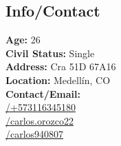 \documentclass[american]{cv-class}
\begin{document}
\begin{aside}
	\section{Info/Contact}
	\textbf{Age:} 26 \\
	\textbf{Civil Status:} Single \\
	\textbf{Address:} Cra 51D 67A16 \\
	\textbf{Location:} Medellín, CO \\
	\textbf{Contact/Email:}\\ \href{https://bit.ly/3ls6eXV}{/+573116345180}\\
	\href{https://join.skype.com/invite/GVNxPbWtJxdc}{/carlos.orozco22}\\
	\href{mailto:carlos940807@gmail.com}{/carlos940807}
	~

\end{aside}
\end{document}
